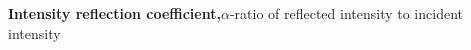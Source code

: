 \documentclass{article}
\begin{document}
\begin{flushleft}
 \textbf{Intensity reflection coefficient,$\alpha$}-ratio of reflected intensity to incident intensity
 
 
 
 \begin{comment}
 
 \textbf{Hoi}- the computer gg
 
 \textbf{UWU}-uwu (´$\cdot \omega \cdot$`)
 
 \textbf{XD}-Eksdee \texttt{[image: XD.png]}
 
 \textbf{Yosha}- \texttt{[image: Pepe.jpg]}
 
\textbf{$\int$}- snack
\end{comment} 
 
 
\end{flushleft}
\newpage 

\end{document}
